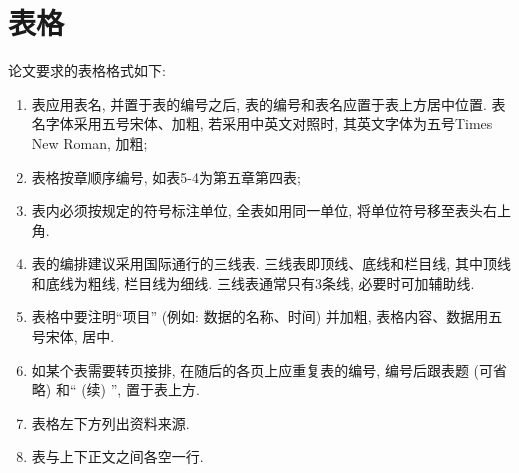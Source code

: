 \section{表格}

论文要求的表格格式如下:
\begin{enumerate}
    \item 表应用表名, 并置于表的编号之后, 表的编号和表名应置于表上方居中位置. 表名字体采用五号宋体、加粗, 若采用中英文对照时, 其英文字体为五号Times New Roman, 加粗;
    \item 表格按章顺序编号, 如表5-4为第五章第四表;
    \item 表内必须按规定的符号标注单位, 全表如用同一单位, 将单位符号移至表头右上角.
    \item 表的编排建议采用国际通行的三线表. 三线表即顶线、底线和栏目线, 其中顶线和底线为粗线, 栏目线为细线. 三线表通常只有3条线, 必要时可加辅助线.
    \item 表格中要注明``项目'' (例如: 数据的名称、时间) 并加粗, 表格内容、数据用五号宋体, 居中.
    \item 如某个表需要转页接排, 在随后的各页上应重复表的编号, 编号后跟表题 (可省略) 和`` (续) '', 置于表上方.
    \item 表格左下方列出资料来源.
    \item 表与上下正文之间各空一行.
\end{enumerate}

